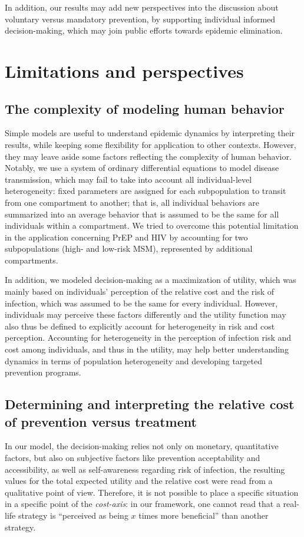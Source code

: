 In addition, our results may add new perspectives into the discussion about voluntary versus mandatory prevention, by supporting individual informed decision-making, which may join public efforts towards epidemic elimination.

\section{Limitations and perspectives}

\subsection{The complexity of modeling human behavior}
Simple models are useful to understand epidemic dynamics by interpreting their results, while keeping some flexibility for application to other contexts. However, they may leave aside some factors reflecting the complexity of human behavior. Notably, we use a system of ordinary differential equations to model disease transmission, which may fail to take into account all individual-level heterogeneity: fixed parameters are assigned for each subpopulation to transit from one compartment to another; that is, all individual behaviors are summarized into an average behavior that is assumed to be the same for all individuals within a compartment. We tried to overcome this potential limitation in the application concerning PrEP and HIV by accounting for two subpopulations (high- and low-risk MSM), represented by additional compartments. 

In addition, we modeled decision-making as a maximization of utility, which was mainly based on individuals' perception of the relative cost and the risk of infection, which was assumed to be the same for every individual. However, individuals may perceive these factors differently and the utility function may also thus be defined to explicitly account for heterogeneity in risk and cost perception. Accounting for heterogeneity in the perception of infection risk and cost among individuals, and thus in the utility, may help better understanding dynamics in terms of population heterogeneity and developing targeted prevention programs.

\subsection{Determining and interpreting the relative cost of prevention versus treatment}
In our model, the decision-making relies not only on monetary, quantitative factors, but also on subjective factors like prevention acceptability and accessibility, as well as self-awareness regarding risk of infection, the resulting values for the total expected utility and the relative cost were read from a qualitative point of view. Therefore, it is not possible to place a specific situation in a specific point of the {\it cost-axis}: in our framework, one cannot read that a real-life strategy is ``perceived as being $x$ times more beneficial'' than another strategy. 

